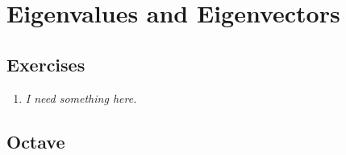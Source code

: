 
\section{Eigenvalues and Eigenvectors}

\subsection*{Exercises}

\begin{enumerate}

\item \emph{I need something here.}

\end{enumerate}

\subsection*{Octave}
